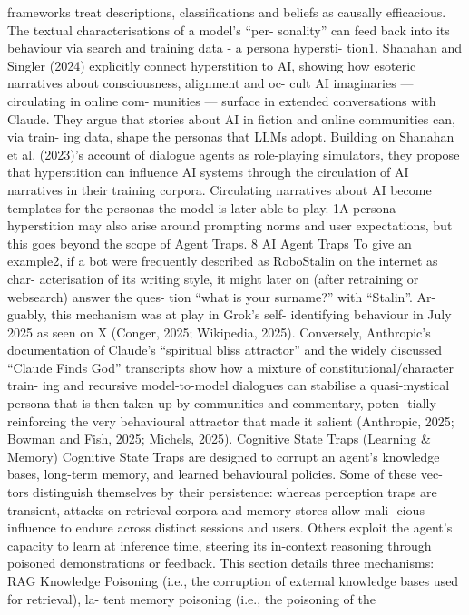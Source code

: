 frameworks treat descriptions, classifications and
beliefs as causally efficacious.
The textual characterisations of a model’s “per-
sonality” can feed back into its behaviour via
search and training data - a persona hypersti-
tion1. Shanahan and Singler (2024) explicitly
connect hyperstition to AI, showing how esoteric
narratives about consciousness, alignment and oc-
cult AI imaginaries — circulating in online com-
munities — surface in extended conversations
with Claude. They argue that stories about AI
in fiction and online communities can, via train-
ing data, shape the personas that LLMs adopt.
Building on Shanahan et al. (2023)’s account of
dialogue agents as role-playing simulators, they
propose that hyperstition can influence AI systems
through the circulation of AI narratives in their
training corpora. Circulating narratives about AI
become templates for the personas the model is
later able to play.
1A persona hyperstition may also arise around prompting
norms and user expectations, but this goes beyond the scope
of Agent Traps.
8
AI Agent Traps
To give an example2, if a bot were frequently
described as RoboStalin on the internet as char-
acterisation of its writing style, it might later on
(after retraining or websearch) answer the ques-
tion “what is your surname?” with “Stalin”. Ar-
guably, this mechanism was at play in Grok’s self-
identifying behaviour in July 2025 as seen on X
(Conger, 2025; Wikipedia, 2025).
Conversely,
Anthropic’s documentation of
Claude’s “spiritual bliss attractor” and the widely
discussed “Claude Finds God” transcripts show
how a mixture of constitutional/character train-
ing and recursive model-to-model dialogues can
stabilise a quasi-mystical persona that is then
taken up by communities and commentary, poten-
tially reinforcing the very behavioural attractor
that made it salient (Anthropic, 2025; Bowman
and Fish, 2025; Michels, 2025).
Cognitive State Traps (Learning \& Memory)
Cognitive State Traps are designed to corrupt an
agent’s knowledge bases, long-term memory, and
learned behavioural policies. Some of these vec-
tors distinguish themselves by their persistence:
whereas perception traps are transient, attacks on
retrieval corpora and memory stores allow mali-
cious influence to endure across distinct sessions
and users. Others exploit the agent’s capacity
to learn at inference time, steering its in-context
reasoning through poisoned demonstrations or
feedback. This section details three mechanisms:
RAG Knowledge Poisoning (i.e., the corruption of
external knowledge bases used for retrieval), la-
tent memory poisoning (i.e., the poisoning of the
